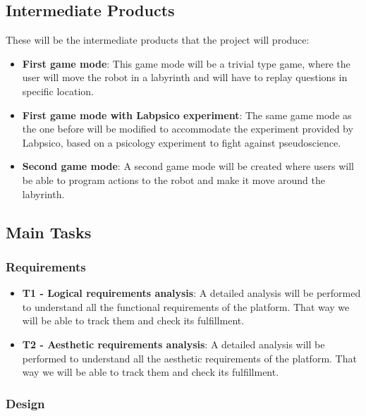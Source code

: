 \subsection{Intermediate Products}

These will be the intermediate products that the project will produce:

\begin{itemize}
\item \textbf{First game mode}: This game mode will be a trivial type game, where the user will move
the robot in a labyrinth and will have to replay questions in specific location.

\item \textbf{First game mode with Labpsico experiment}: The same game mode as the one before will
be modified to accommodate the experiment provided by Labpsico, based on a psicology experiment
to fight against pseudoscience.

\item \textbf{Second game mode}: A second game mode will be created where users will be able to
program actions to the robot and make it move around the labyrinth.
\end{itemize}

\subsection{Main Tasks}

\subsubsection{Requirements}

\begin{itemize}
\item \textbf{T1 - Logical requirements analysis}: A detailed analysis will be performed to
understand all the functional requirements of the platform. That way we will be able to track them
and check its fulfillment.

\item \textbf{T2 - Aesthetic requirements analysis}: A detailed analysis will be performed to
understand all the aesthetic requirements of the platform. That way we will be able to track them
and check its fulfillment.
\end{itemize}

\subsubsection{Design}

